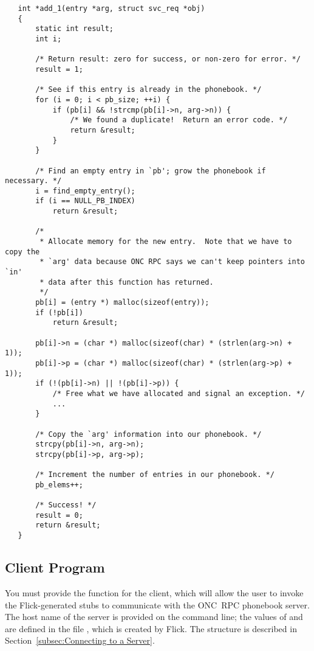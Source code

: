 \begin{verbatim}
   int *add_1(entry *arg, struct svc_req *obj)
   {
       static int result;
       int i;

       /* Return result: zero for success, or non-zero for error. */
       result = 1;

       /* See if this entry is already in the phonebook. */
       for (i = 0; i < pb_size; ++i) {
           if (pb[i] && !strcmp(pb[i]->n, arg->n)) {
               /* We found a duplicate!  Return an error code. */
               return &result;
           }
       }

       /* Find an empty entry in `pb'; grow the phonebook if necessary. */
       i = find_empty_entry();
       if (i == NULL_PB_INDEX)
           return &result;

       /*
        * Allocate memory for the new entry.  Note that we have to copy the
        * `arg' data because ONC RPC says we can't keep pointers into `in'
        * data after this function has returned.
        */
       pb[i] = (entry *) malloc(sizeof(entry));
       if (!pb[i])
           return &result;

       pb[i]->n = (char *) malloc(sizeof(char) * (strlen(arg->n) + 1));
       pb[i]->p = (char *) malloc(sizeof(char) * (strlen(arg->p) + 1));
       if (!(pb[i]->n) || !(pb[i]->p)) {
           /* Free what we have allocated and signal an exception. */
           ...
       }

       /* Copy the `arg' information into our phonebook. */
       strcpy(pb[i]->n, arg->n);
       strcpy(pb[i]->p, arg->p);

       /* Increment the number of entries in our phonebook. */
       pb_elems++;

       /* Success! */
       result = 0;
       return &result;
   }
\end{verbatim}



\subsection{Client Program}
\label{subsec:ONCRPC:Client Program}

You must provide the  function for the client, which will allow
the user to invoke the Flick-generated stubs to communicate with the ONC~RPC
phonebook server.  The host name of the server is provided on the command line;
the values of  and  are defined
in the file , which is created by Flick.  The
 structure is described in
Section~\ref{subsec:Connecting to a Server}.

